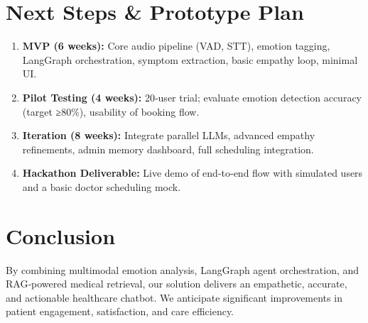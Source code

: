 \documentclass[11pt,a4paper]{article}
\begin{document}
\section{Next Steps \& Prototype Plan}
\begin{enumerate}[left=0pt]
  \item \textbf{MVP (6 weeks):} Core audio pipeline (VAD, STT), emotion tagging, LangGraph orchestration, symptom extraction, basic empathy loop, minimal UI.
  \item \textbf{Pilot Testing (4 weeks):} 20‐user trial; evaluate emotion detection accuracy (target ≥80\%), usability of booking flow.
  \item \textbf{Iteration (8 weeks):} Integrate parallel LLMs, advanced empathy refinements, admin memory dashboard, full scheduling integration.
  \item \textbf{Hackathon Deliverable:} Live demo of end‐to‐end flow with simulated users and a basic doctor scheduling mock.
\end{enumerate}

\section{Conclusion}
By combining multimodal emotion analysis, LangGraph agent orchestration, and RAG‐powered medical retrieval, our solution delivers an empathetic, accurate, and actionable healthcare chatbot. We anticipate significant improvements in patient engagement, satisfaction, and care efficiency.
\end{document}
